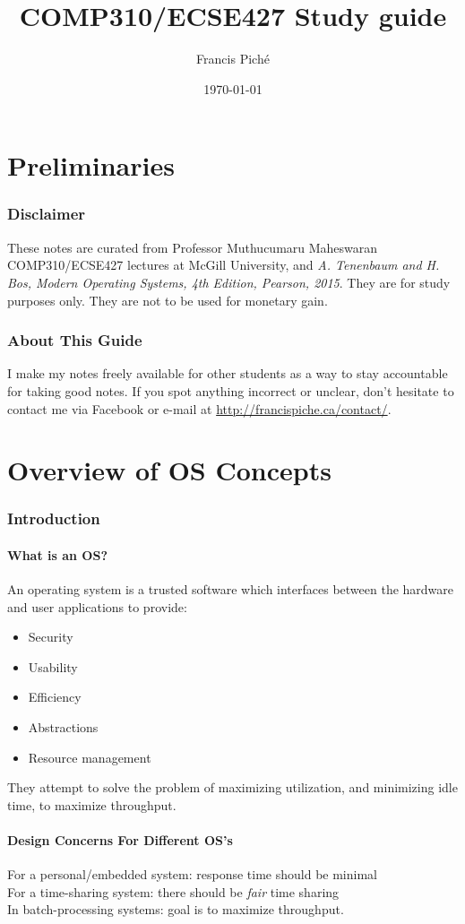 \documentclass[12pt]{article}
\theoremstyle{definition}
\begin{document}
\title{COMP310/ECSE427 Study guide}
\author{Francis Pich\'e}
\date{\today}
\maketitle
\newpage
\tableofcontents
\newpage

\part{Preliminaries}
\section{Disclaimer}
These notes are curated from Professor Muthucumaru Maheswaran COMP310/ECSE427 lectures at McGill University, and \textit{A. Tenenbaum and H. Bos, Modern Operating Systems, 4th Edition, Pearson, 2015}. They are for study purposes only. They are not to be used for monetary gain. 
\section{About This Guide}
I make my notes freely available for other students as a way to stay accountable for taking good notes. If you spot anything incorrect or unclear, don't hesitate to contact me via Facebook or e-mail at \url{http://francispiche.ca/contact/}.
\part{Overview of OS Concepts}
\section{Introduction}
\subsection{What is an OS?}
An operating system is a trusted software which interfaces between the hardware and user applications to provide: 
\begin{itemize}
	\item Security
	\item Usability
	\item Efficiency
	\item Abstractions
	\item Resource management
\end{itemize}
They attempt to solve the problem of maximizing utilization, and minimizing idle time, to maximize throughput.
\subsection{Design Concerns For Different OS's}
For a personal/embedded system: response time should be minimal
\\ \linebreak
For a time-sharing system: there should be \textit{fair} time sharing
\\ \linebreak
In batch-processing systems: goal is to maximize throughput.
\end{document}
